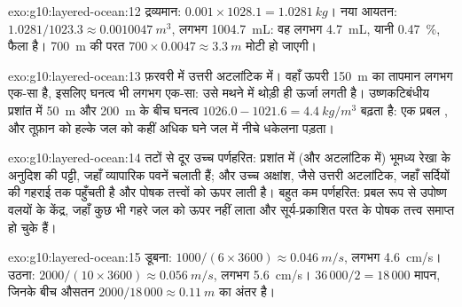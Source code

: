 \begin{solution}{exo:g10:layered-ocean:12}
द्रव्यमान: $0.001 \times 1028.1 = \qty{1.0281}{kg}$। नया आयतन: $1.0281/1023.3
\approx \qty{0.0010047}{m^3}$, लगभग \qty{1004.7}{mL}: वह लगभग
\qty{4.7}{mL}, यानी \qty{0.47}{\percent}, फैला है। \qty{700}{m} की परत
$700 \times 0.0047 \approx \qty{3.3}{m}$ मोटी हो जाएगी।
\end{solution}

\begin{solution}{exo:g10:layered-ocean:13}
फ़रवरी में उत्तरी अटलांटिक में। वहाँ ऊपरी \qty{150}{m} का तापमान लगभग
एक-सा है, इसलिए घनत्व भी लगभग एक-सा: उसे मथने में थोड़ी ही ऊर्जा लगती है।
उष्णकटिबंधीय प्रशांत में \qty{50}{m} और \qty{200}{m} के बीच घनत्व $1026.0 - 1021.6 =
\qty{4.4}{kg/m^3}$ बढ़ता है: एक प्रबल
, और तूफ़ान को हल्के जल को कहीं अधिक घने जल में नीचे
धकेलना पड़ता।
\end{solution}

\begin{solution}{exo:g10:layered-ocean:14}
तटों से दूर उच्च पर्णहरित: प्रशांत में (और अटलांटिक में) भूमध्य रेखा के अनुदिश की पट्टी,
जहाँ व्यापारिक पवनें  चलाती हैं; और उच्च
अक्षांश, जैसे उत्तरी अटलांटिक, जहाँ सर्दियों की  गहराई तक
पहुँचती है और पोषक तत्त्वों को ऊपर लाती है। बहुत कम पर्णहरित: प्रबल रूप से 
उपोष्ण वलयों के केंद्र, जहाँ कुछ भी गहरे जल को ऊपर नहीं लाता
और सूर्य-प्रकाशित परत के पोषक तत्त्व समाप्त हो चुके हैं।
\end{solution}

\begin{solution}{exo:g10:layered-ocean:15}
डूबना: $1000/(6 \times 3600) \approx \qty{0.046}{m/s}$, लगभग
\qty{4.6}{cm/s}। उठना: $2000/(10 \times 3600) \approx \qty{0.056}{m/s}$,
लगभग \qty{5.6}{cm/s}। $36\,000/2 = 18\,000$ मापन, जिनके बीच औसतन
$2000/18\,000 \approx \qty{0.11}{m}$ का अंतर है।
\end{solution}

